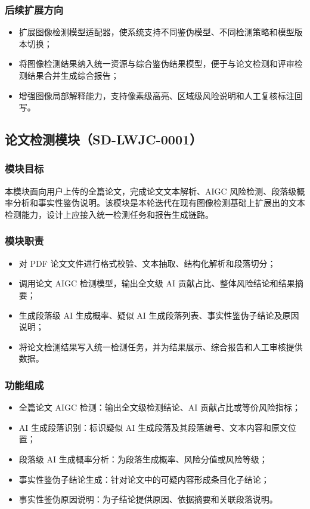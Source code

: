 \subsubsection{后续扩展方向}
\begin{itemize}[leftmargin=2em]
    \item 扩展图像检测模型适配器，使系统支持不同鉴伪模型、不同检测策略和模型版本切换；
    \item 将图像检测结果纳入统一资源与综合鉴伪结果模型，便于与论文检测和评审检测结果合并生成综合报告；
    \item 增强图像局部解释能力，支持像素级高亮、区域级风险说明和人工复核标注回写。
\end{itemize}

\subsection{论文检测模块（SD-LWJC-0001）}

\subsubsection{模块目标}
本模块面向用户上传的全篇论文，完成论文文本解析、AIGC 风险检测、段落级概率分析和事实性鉴伪说明。该模块是本轮迭代在现有图像检测基础上扩展出的文本检测能力，设计上应接入统一检测任务和报告生成链路。

\subsubsection{模块职责}
\begin{itemize}[leftmargin=2em]
    \item 对 PDF 论文文件进行格式校验、文本抽取、结构化解析和段落切分；
    \item 调用论文 AIGC 检测模型，输出全文级 AI 贡献占比、整体风险结论和结果摘要；
    \item 生成段落级 AI 生成概率、疑似 AI 生成段落列表、事实性鉴伪子结论及原因说明；
    \item 将论文检测结果写入统一检测任务，并为结果展示、综合报告和人工审核提供数据。
\end{itemize}

\subsubsection{功能组成}
\begin{itemize}[leftmargin=2em]
    \item 全篇论文 AIGC 检测：输出全文级检测结论、AI 贡献占比或等价风险指标；
    \item AI 生成段落识别：标识疑似 AI 生成段落及其段落编号、文本内容和原文位置；
    \item 段落级 AI 生成概率分析：为段落生成概率、风险分值或风险等级；
    \item 事实性鉴伪子结论生成：针对论文中的可疑内容形成条目化子结论；
    \item 事实性鉴伪原因说明：为子结论提供原因、依据摘要和关联段落说明。
\end{itemize}

